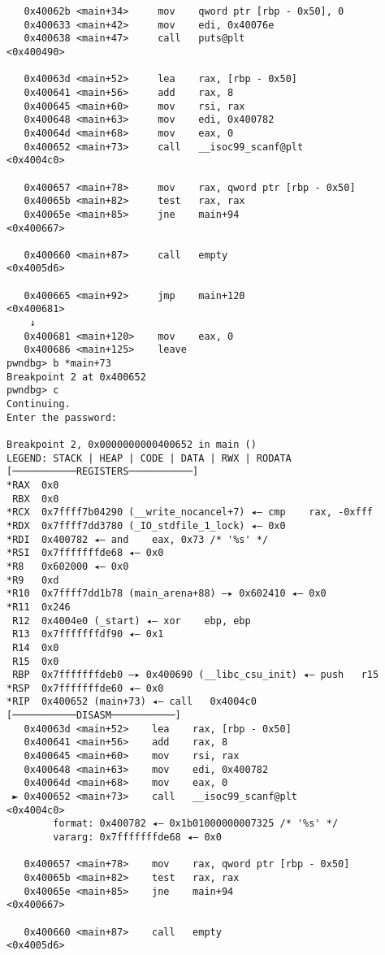 \begin{lstlisting}
   0x40062b <main+34>     mov    qword ptr [rbp - 0x50], 0
   0x400633 <main+42>     mov    edi, 0x40076e
   0x400638 <main+47>     call   puts@plt                      <0x400490>
 
   0x40063d <main+52>     lea    rax, [rbp - 0x50]
   0x400641 <main+56>     add    rax, 8
   0x400645 <main+60>     mov    rsi, rax
   0x400648 <main+63>     mov    edi, 0x400782
   0x40064d <main+68>     mov    eax, 0
   0x400652 <main+73>     call   __isoc99_scanf@plt            <0x4004c0>
 
   0x400657 <main+78>     mov    rax, qword ptr [rbp - 0x50]
   0x40065b <main+82>     test   rax, rax
   0x40065e <main+85>     jne    main+94                       <0x400667>
 
   0x400660 <main+87>     call   empty                         <0x4005d6>
 
   0x400665 <main+92>     jmp    main+120                      <0x400681>
    ↓
   0x400681 <main+120>    mov    eax, 0
   0x400686 <main+125>    leave  
pwndbg> b *main+73
Breakpoint 2 at 0x400652
pwndbg> c
Continuing.
Enter the password:

Breakpoint 2, 0x0000000000400652 in main ()
LEGEND: STACK | HEAP | CODE | DATA | RWX | RODATA
[───────────REGISTERS───────────]
*RAX  0x0
 RBX  0x0
*RCX  0x7ffff7b04290 (__write_nocancel+7) ◂— cmp    rax, -0xfff
*RDX  0x7ffff7dd3780 (_IO_stdfile_1_lock) ◂— 0x0
*RDI  0x400782 ◂— and    eax, 0x73 /* '%s' */
*RSI  0x7fffffffde68 ◂— 0x0
*R8   0x602000 ◂— 0x0
*R9   0xd
*R10  0x7ffff7dd1b78 (main_arena+88) —▸ 0x602410 ◂— 0x0
*R11  0x246
 R12  0x4004e0 (_start) ◂— xor    ebp, ebp
 R13  0x7fffffffdf90 ◂— 0x1
 R14  0x0
 R15  0x0
 RBP  0x7fffffffdeb0 —▸ 0x400690 (__libc_csu_init) ◂— push   r15
*RSP  0x7fffffffde60 ◂— 0x0
*RIP  0x400652 (main+73) ◂— call   0x4004c0
[───────────DISASM───────────]
   0x40063d <main+52>    lea    rax, [rbp - 0x50]
   0x400641 <main+56>    add    rax, 8
   0x400645 <main+60>    mov    rsi, rax
   0x400648 <main+63>    mov    edi, 0x400782
   0x40064d <main+68>    mov    eax, 0
 ► 0x400652 <main+73>    call   __isoc99_scanf@plt            <0x4004c0>
        format: 0x400782 ◂— 0x1b01000000007325 /* '%s' */
        vararg: 0x7fffffffde68 ◂— 0x0
 
   0x400657 <main+78>    mov    rax, qword ptr [rbp - 0x50]
   0x40065b <main+82>    test   rax, rax
   0x40065e <main+85>    jne    main+94                       <0x400667>
 
   0x400660 <main+87>    call   empty                         <0x4005d6>
 

\end{lstlisting}
